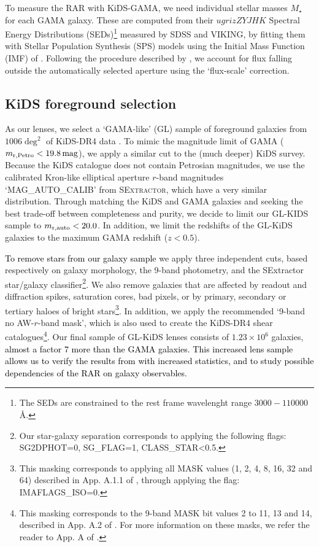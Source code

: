 \documentclass[usenatbib]{mnras}
\newcommand{\magn}{\, {\rm mag} }
\newcommand*{\E}[1]{\times 10^{#1}}
\newcommand{\un}[1]{_{\rm #1}}
\begin{document}
To measure the RAR with KiDS-GAMA, we need individual stellar masses $M_\star$ for each GAMA galaxy. These are computed from their $ugrizZYJHK$ Spectral Energy Distributions (SEDs)\footnote{The SEDs are constrained to the rest frame wavelenght range $3000-110000$ \AA.} measured by SDSS and VIKING, by fitting them with \cite{bruzual2003} Stellar Population Synthesis (SPS) models using the Initial Mass Function (IMF) of \cite{chabrier2003}. Following the procedure described by \cite{taylor2011}, we account for flux falling outside the automatically selected aperture using the `flux-scale' correction.

\subsection{KiDS foreground selection}
\label{sec:gamalike_kids}

As our lenses, we select a `GAMA-like' (GL) sample of foreground galaxies from $1006 \deg^2$ of KiDS-DR4 data \cite[KiDS-1000,][]{kuijken2019}. To mimic the magnitude limit of GAMA ($m\un{r,Petro}<19.8 \magn$), we apply a similar cut to the (much deeper) KiDS survey. Because the KiDS catalogue does not contain Petrosian magnitudes, we use the calibrated Kron-like elliptical aperture $r$-band magnitudes `MAG\_AUTO\_CALIB' from \textsc{SExtractor}, which have a very similar distribution. Through matching the KiDS and GAMA galaxies and seeking the best trade-off between completeness and purity, we decide to limit our GL-KIDS sample to $m\un{r,auto}<20.0$. In addition, we limit the redshifts of the GL-KiDS galaxies to the maximum GAMA redshift ($z<0.5$).

\textcolor{black}{To remove stars from our galaxy sample} we apply three independent cuts, based respectively on galaxy morphology, the 9-band photometry, and the SExtractor star/galaxy classifier\footnote{Our star-galaxy separation corresponds to applying the following flags: SG2DPHOT=0, SG\_FLAG=1, CLASS\_STAR<0.5.}. We also remove galaxies that are affected by readout and diffraction spikes, saturation cores, bad pixels, or by primary, secondary or tertiary haloes of bright stars\footnote{This masking corresponds to applying all MASK values (1, 2, 4, 8, 16, 32 and 64) described in App. A.1.1 of \cite{kuijken2019}, through applying the flag: IMAFLAGS\_ISO=0.}. In addition, we apply the recommended `9-band no AW-$r$-band mask', which is also used to create the KiDS-DR4 shear catalogues\footnote{This masking corresponds to the 9-band MASK bit values 2 to 11, 13 and 14, described in App. A.2 of \cite{kuijken2019}. For more information on these masks, we refer the reader to App. A of \cite{kuijken2019}.}. Our final sample of GL-KiDS lenses consists of $1.23\E{6}$ galaxies, \textcolor{black}{almost a factor 7 more than the GAMA galaxies. This increased lens sample allows us to verify the results from \cite{brouwer2017} with increased statistics, and to study possible dependencies of the RAR on galaxy observables.}
\end{document}
